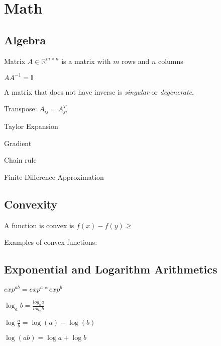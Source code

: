 \section{Math}
\subsection{Algebra}

Matrix $A \in\mathbb R^{m\times n}$ is a matrix with $m$ rows and $n$ columns

$AA^{-1}=\mathbb{I}$

A matrix that does not have inverse is \emph{singular} or \emph{degenerate}.

Transpose: $A_{ij} = A_{ji}^T$

Taylor Expansion

Gradient

Chain rule

Finite Difference Approximation

\subsection{Convexity}

A function is convex is $f(x) - f(y) \ge $

Examples of convex functions: 

\subsection{Exponential and Logarithm Arithmetics}

$exp^{ab} = exp^a*exp^b$

$\log_ab = \frac{log_n a}{log_n b}$

$\log\frac{a}{b} = \log(a) -\log(b)$

$\log(ab) = \log a + \log b$
